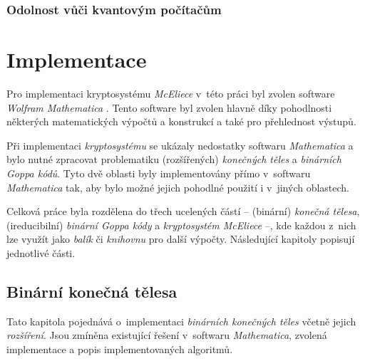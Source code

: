 \documentclass[thesis=M,czech,hidelinks]{FITthesis}[2012/06/26]
\newcommand{\0}{{\textcolor[gray]{0.80}{0}}}
\begin{document}
\subsection{Odolnost vůči kvantovým počítačům}
\cite{Post-Quantum_Cryptography}
\cite{Schanck}


\chapter{Implementace}\label{kap_implementace}
Pro implementaci kryptosystému \emph{McEliece} v~této práci byl zvolen software
\emph{Wolfram Mathematica} \cite{Mathematica}. Tento software byl zvolen hlavně
díky pohodlnosti některých matematických výpočtů a konstrukcí a také pro
přehlednost výstupů. %

Při implementaci \emph{kryptosystému} se ukázaly nedostatky softwaru
\emph{Mathematica} a bylo nutné zpracovat problematiku (rozšířených)
\emph{konečných těles} a \emph{binárních Goppa kódů}. Tyto dvě oblasti byly
implementovány přímo v~softwaru \emph{Mathematica} tak, aby bylo možné jejich
pohodlné použití i v~jiných oblastech.

Celková práce byla rozdělena do třech ucelených částí -- (binární) \emph{konečná
tělesa}, (ireducibilní) \emph{binární Goppa kódy} a \emph{kryptosystém
McEliece} --, kde každou z~nich lze využít jako \emph{balík} či \emph{knihovnu}
pro další výpočty. Následující kapitoly popisují jednotlivé části.


\section{Binární konečná tělesa}
Tato kapitola pojednává o~implementaci \emph{binárních konečných těles} včetně
jejich \emph{rozšíření}. Jsou zmíněna existující řešení v~softwaru
\emph{Mathematica}, zvolená implementace a popis implementovaných algoritmů.
\end{document}
